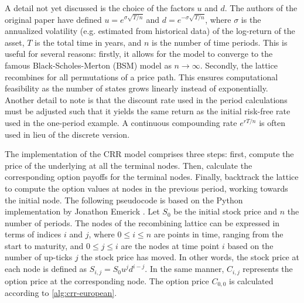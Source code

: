 \documentclass[english,12pt,a4paper,pdftex,sci,utf8]{aaltothesis}
\begin{document}
A detail not yet discussed is the choice of the factors $u$ and $d$. The authors of the original paper have defined $u = e^{\sigma\sqrt{T/n}}$ and $d = e^{-\sigma\sqrt{T/n}}$, where $\sigma$ is the annualized volatility (e.g. estimated from historical data) of the log-return of the asset, $T$ is the total time in years, and $n$ is the number of time periods. This is useful for several reasons: firstly, it allows for the model to converge to the famous Black-Scholes-Merton (BSM) model as $n \rightarrow \infty$. Secondly, the lattice recombines for all permutations of a price path. This ensures computational feasibility as the number of states grows linearly instead of exponentially. Another detail to note is that the discount rate used in the period calculations must be adjusted such that it yields the same return as the initial risk-free rate used in the one-period example. A continuous compounding rate $e^{rT/n}$ is often used in lieu of the discrete version. \cite{cox1979option} \cite{hull2013fundamentals}

The implementation of the CRR model comprises three steps: first, compute the price of the underlying at all the terminal nodes. Then, calculate the corresponding option payoffs for the terminal nodes. Finally, backtrack the lattice to compute the option values at nodes in the previous period, working towards the initial node. The following pseudocode is based on the Python implementation by Jonathon Emerick \cite{thequantpy2024github}. Let $S_0$ be the initial stock price and $n$ the number of periods. The nodes of the recombining lattice can be expressed in terms of indices $i$ and $j$, where $0 \leq i \leq n$ are points in time, ranging from the start to maturity, and $0 \le j \le i$ are the nodes at time point $i$ based on the number of up-ticks $j$ the stock price has moved. In other words, the stock price at each node is defined as $S_{i,j} = S_0u^jd^{i-j}$. In the same manner, $C_{i,j}$ represents the option price at the corresponding node. The option price  $C_{0,0}$ is calculated according to \cref{alg:crr-european}.
\end{document}
